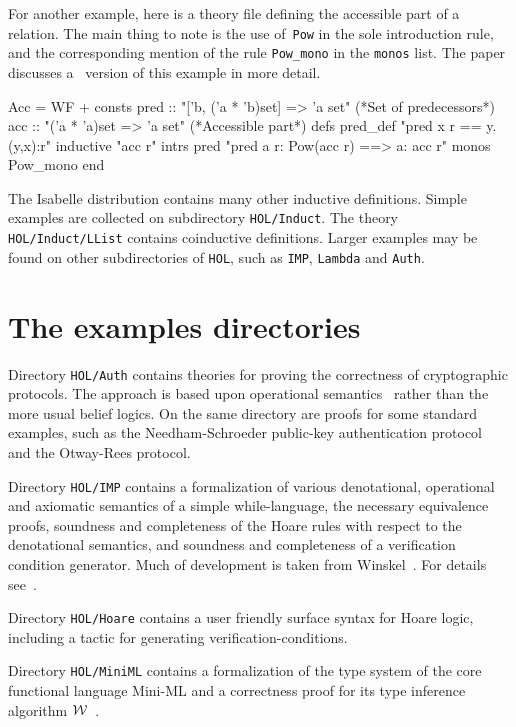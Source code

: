 For another example, here is a theory file defining the accessible
part of a relation.  The main thing to note is the use of~\texttt{Pow} in
the sole introduction rule, and the corresponding mention of the rule
\verb|Pow_mono| in the \texttt{monos} list.  The paper
\cite{paulson-CADE} discusses a \ZF\ version of this example in more
detail.
\begin{ttbox}
Acc = WF + 
consts pred :: "['b, ('a * 'b)set] => 'a set"   (*Set of predecessors*)
       acc  :: "('a * 'a)set => 'a set"         (*Accessible part*)
defs   pred_def  "pred x r == {y. (y,x):r}"
inductive "acc r"
  intrs
     pred "pred a r: Pow(acc r) ==> a: acc r"
  monos   Pow_mono
end
\end{ttbox}
The Isabelle distribution contains many other inductive definitions.  Simple
examples are collected on subdirectory \texttt{HOL/Induct}.  The theory
\texttt{HOL/Induct/LList} contains coinductive definitions.  Larger examples
may be found on other subdirectories of \texttt{HOL}, such as \texttt{IMP},
\texttt{Lambda} and \texttt{Auth}.

 


\section{The examples directories}

Directory \texttt{HOL/Auth} contains theories for proving the correctness of 
cryptographic protocols.  The approach is based upon operational 
semantics~\cite{paulson-security} rather than the more usual belief logics.
On the same directory are proofs for some standard examples, such as the 
Needham-Schroeder public-key authentication protocol~\cite{paulson-ns} 
and the Otway-Rees protocol.

Directory \texttt{HOL/IMP} contains a formalization of various denotational,
operational and axiomatic semantics of a simple while-language, the necessary
equivalence proofs, soundness and completeness of the Hoare rules with respect
to the 
denotational semantics, and soundness and completeness of a verification
condition generator.  Much of development is taken from
Winskel~\cite{winskel93}.  For details see~\cite{nipkow-IMP}.

Directory \texttt{HOL/Hoare} contains a user friendly surface syntax for Hoare
logic, including a tactic for generating verification-conditions.

Directory \texttt{HOL/MiniML} contains a formalization of the type system of the
core functional language Mini-ML and a correctness proof for its type
inference algorithm $\cal W$~\cite{milner78,nazareth-nipkow}.

